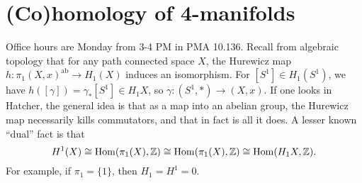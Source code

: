 \section{(Co)homology of 4-manifolds} 
Office hours are Monday from 3-4 PM in PMA 10.136.
\orbreak
Recall from algebraic topology that for any path connected space $X$, the Hurewicz map $h \colon \pi_1(X,x) ^{\mathrm{ab}} \to H_1(X)$ induces an isomorphism. For $[S^1 ] \in H_1(S^1 )$, we have $h([\gamma ]) = \gamma _*[S^1 ] \in  H_1 X$, so $\gamma  \colon (S^1 ,*) \to (X,x)$. If one looks in Hatcher, the general idea is that as a map into an abelian group, the Hurewicz map necessarily kills commutators, and that in fact is all it does. A lesser known ``dual'' fact is that \[
    H^1(X) \cong \operatorname{Hom} (\pi_1 (X), \mathbb{Z}) \cong \operatorname{Hom}(\pi_1(X), \mathbb{Z}) \cong \operatorname{Hom}(H_1 X, \mathbb{Z}).
\]  For example, if $\pi_1 = \{1\} $, then $H_1 = H^1 = 0$.
